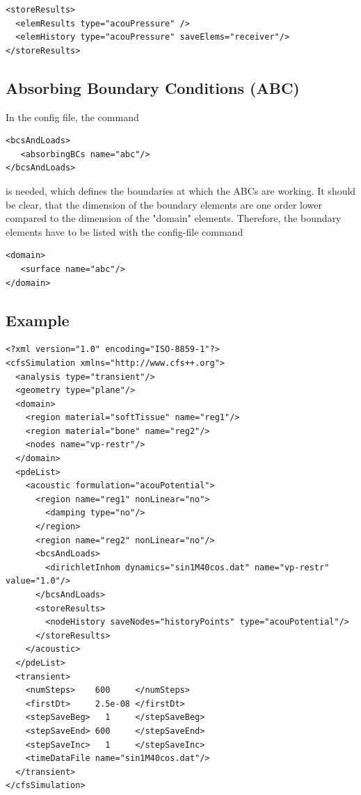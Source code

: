 \begin{verbatim}
<storeResults>
  <elemResults type="acouPressure" />
  <elemHistory type="acouPressure" saveElems="receiver"/>
</storeResults>
\end{verbatim}



\subsection{Absorbing Boundary Conditions (ABC)} 
In the config file, the command

\begin{verbatim}    
<bcsAndLoads>  
   <absorbingBCs name="abc"/>
</bcsAndLoads>
\end{verbatim}
      
is needed, which defines the boundaries at which the ABCs are working.
It should be clear, that the dimension of the boundary elements are
one order lower compared to the dimension of the "domain" elements.
Therefore, the boundary elements have to be listed with the config-file
command

\begin{verbatim}
<domain>
   <surface name="abc"/>
</domain>
\end{verbatim}

\subsection{Example}

{\footnotesize 
\begin{verbatim}
<?xml version="1.0" encoding="ISO-8859-1"?>
<cfsSimulation xmlns="http://www.cfs++.org">
  <analysis type="transient"/>
  <geometry type="plane"/>
  <domain>
    <region material="softTissue" name="reg1"/>
    <region material="bone" name="reg2"/>
    <nodes name="vp-restr"/>
  </domain>
  <pdeList>
    <acoustic formulation="acouPotential">
      <region name="reg1" nonLinear="no">
        <damping type="no"/>
      </region>
      <region name="reg2" nonLinear="no"/>
      <bcsAndLoads>
        <dirichletInhom dynamics="sin1M40cos.dat" name="vp-restr" value="1.0"/>
      </bcsAndLoads>
      <storeResults>
        <nodeHistory saveNodes="historyPoints" type="acouPotential"/>
      </storeResults>
    </acoustic>
  </pdeList>
  <transient>
    <numSteps>    600     </numSteps>
    <firstDt>     2.5e-08 </firstDt>
    <stepSaveBeg>   1     </stepSaveBeg>
    <stepSaveEnd> 600     </stepSaveEnd>
    <stepSaveInc>   1     </stepSaveInc>
    <timeDataFile name="sin1M40cos.dat"/>
  </transient>
</cfsSimulation>
\end{verbatim}
}


